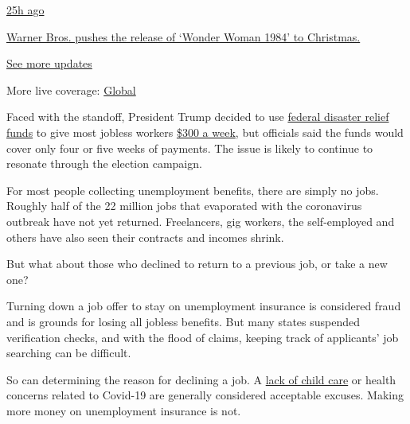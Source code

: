 \href{https://www.nytimes3xbfgragh.onion/live/2020/09/11/business/stock-market-today-coronavirus?action=click\&pgtype=Article\&state=default\&region=MAIN_CONTENT_1\&context=storylines_live_updates\#warner-bros-pushes-the-release-of-wonder-woman-1984-to-christmas}{25h
ago}

\href{https://www.nytimes3xbfgragh.onion/live/2020/09/11/business/stock-market-today-coronavirus?action=click\&pgtype=Article\&state=default\&region=MAIN_CONTENT_1\&context=storylines_live_updates\#warner-bros-pushes-the-release-of-wonder-woman-1984-to-christmas}{Warner
Bros. pushes the release of `Wonder Woman 1984' to Christmas.}

\href{https://www.nytimes3xbfgragh.onion/live/2020/09/11/business/stock-market-today-coronavirus?action=click\&pgtype=Article\&state=default\&region=MAIN_CONTENT_1\&context=storylines_live_updates}{See
more updates}

More live coverage:
\href{https://www.nytimes3xbfgragh.onion/2020/09/11/world/covid-19-coronavirus.html?action=click\&pgtype=Article\&state=default\&region=MAIN_CONTENT_1\&context=storylines_live_updates}{Global}

Faced with the standoff, President Trump decided to use
\href{https://www.nytimes3xbfgragh.onion/2020/08/13/business/economy/unemployment-benefits-coronavirus.html}{federal
disaster relief funds} to give most jobless workers
\href{https://www.nytimes3xbfgragh.onion/article/stimulus-unemployment-payment-benefit.html}{\$300
a week}, but officials said the funds would cover only four or five
weeks of payments. The issue is likely to continue to resonate through
the election campaign.

For most people collecting unemployment benefits, there are simply no
jobs. Roughly half of the 22 million jobs that evaporated with the
coronavirus outbreak have not yet returned. Freelancers, gig workers,
the self-employed and others have also seen their contracts and incomes
shrink.

But what about those who declined to return to a previous job, or take a
new one?

Turning down a job offer to stay on unemployment insurance is considered
fraud and is grounds for losing all jobless benefits. But many states
suspended verification checks, and with the flood of claims, keeping
track of applicants' job searching can be difficult.

So can determining the reason for declining a job. A
\href{https://www.nytimes3xbfgragh.onion/2020/06/03/business/economy/coronavirus-working-women.html}{lack
of child care} or health concerns related to Covid-19 are generally
considered acceptable excuses. Making more money on unemployment
insurance is not.

